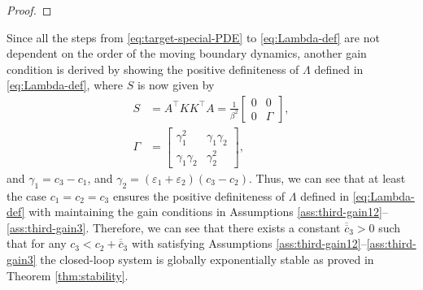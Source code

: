 \documentclass[letterpaper, 10 pt, conference]{cls/ieeeconf}
\theoremstyle{definition}
\newcommand{\ep}{\varepsilon}
\begin{document}
\begin{proof}

\end{proof}

    Since all the steps from \eqref{eq:target-special-PDE} to \eqref{eq:Lambda-def} are not dependent on the order of the moving boundary dynamics, another gain condition is derived by showing the positive definiteness of $\Lambda$ defined in \eqref{eq:Lambda-def}, where $S$ is now given by 
    \begin{align}
        S &= A^\top K K^\top A = \frac{1}{\beta^2}  \left [
    \begin{array}{cc}
       0  & 0 \\
       0  & \Gamma
    \end{array}
    \right] , \\
    \Gamma &= 
     \left [
    \begin{array}{cc}
       \gamma_1^2  & \gamma_1 \gamma_2 \\
      \gamma_1 \gamma_2  & \gamma_2^2
    \end{array}
    \right] , 
    \end{align}
    and  $ \gamma_1 = c_3 - c_1$, and $\gamma_2 = (\ep_1 + \ep_2)(c_3 - c_2)$. 
    Thus, we can see that at least the case $c_1 = c_2 = c_3$ ensures the positive definiteness of $\Lambda$ defined in \eqref{eq:Lambda-def} with maintaining the gain conditions in Assumptions  \ref{ass:third-gain12}--\ref{ass:third-gain3}. Therefore, we can see that there exists a constant $\overline{\overline{c}}_3>0$ such that for any $c_3< c_2 + \overline{\overline{c}}_3$ with satisfying Assumptions  \ref{ass:third-gain12}--\ref{ass:third-gain3} the closed-loop system is globally exponentially stable as proved in Theorem \ref{thm:stability}.  
\end{document}
